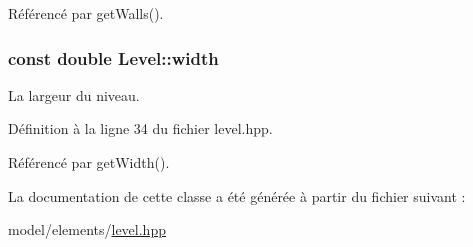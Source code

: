 Référencé par get\+Walls().

\hypertarget{classLevel_ae8e8f0fd1ed923ab9faf37bebb961cdf}{}
\subsubsection[{width}]{\setlength{\rightskip}{0pt plus 5cm}const double Level\+::width\hspace{0.3cm}{\ttfamily [private]}}\label{classLevel_ae8e8f0fd1ed923ab9faf37bebb961cdf}


La largeur du niveau. 



Définition à la ligne 34 du fichier level.\+hpp.



Référencé par get\+Width().



La documentation de cette classe a été générée à partir du fichier suivant \+:\begin{DoxyCompactItemize}
\item 
model/elements/\hyperlink{level_8hpp}{level.\+hpp}\end{DoxyCompactItemize}
